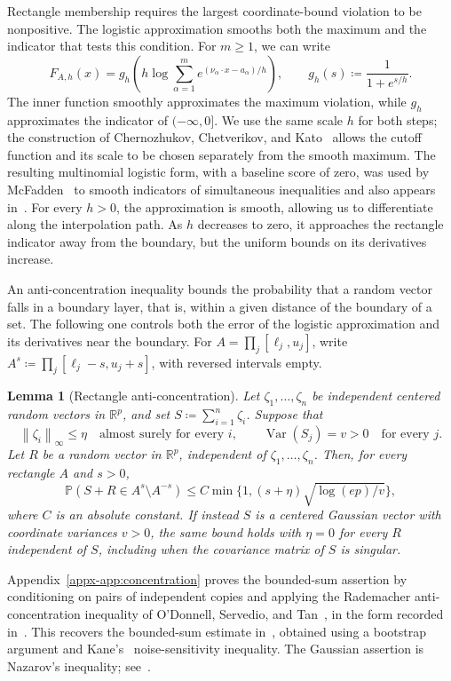 \documentclass[11pt,letterpaper]{article}
\newtheorem{lemma}{Lemma}
\theoremstyle{remark}
\newcommand{\Pp}{\mathbb P}
\newcommand{\R}{\mathbb R}
\newcommand{\Var}{\operatorname{Var}}
\newcommand{\norm}[1]{\left\lVert#1\right\rVert}
\begin{document}
Rectangle membership requires the largest coordinate-bound violation
to be nonpositive. The logistic approximation smooths both the maximum and the
indicator that tests this condition. For \(m\ge1\), we can write
\[
 F_{A,h}(x)=g_h\!\left(h\log\sum_{\alpha=1}^m
 e^{(\nu_\alpha\cdot x-a_\alpha)/h}\right),
 \qquad g_h(s)\coloneqq \frac{1}{1+e^{s/h}}.
\]
The inner function smoothly approximates the maximum violation, while
\(g_h\) approximates the indicator of \(({-\infty},0]\). We use the
same scale \(h\) for both steps; the construction of Chernozhukov,
Chetverikov, and Kato~\cite{CCK2013} allows the cutoff function and
its scale to be chosen separately from the smooth maximum. The
resulting multinomial logistic form, with a baseline score of zero,
was used by McFadden~\cite[p.~1001]{McFadden1989} to smooth indicators
of simultaneous inequalities and also appears in~\cite[eq.~(5)]{GaoZhang}. For every \(h>0\), the approximation
is smooth, allowing us to differentiate along the interpolation path.
As \(h\) decreases to zero, it approaches the rectangle indicator
away from the boundary, but the uniform bounds on its derivatives
increase.

An anti-concentration inequality bounds the probability that a random
vector falls in a boundary layer, that is, within a given distance of
the boundary of a set. The following one controls both the error of
the logistic approximation and its derivatives near the boundary.
For \(A=\prod_j[\ell_j,u_j]\), write
\(A^s\coloneqq \prod_j[\ell_j-s,u_j+s]\), with reversed intervals empty.
\begin{lemma}[Rectangle anti-concentration]\label{lem:concentration}
Let \(\zeta_1,\ldots,\zeta_n\) be independent centered random vectors
in \(\R^p\), and set \(S\coloneqq \sum_{i=1}^n\zeta_i\). Suppose that
\[
 \norm{\zeta_i}_\infty\le\eta
 \quad\text{almost surely for every }i,
 \qquad
 \Var(S_j)=v>0\quad\text{for every }j.
\]
Let \(R\) be a random vector in \(\R^p\), independent of
\(\zeta_1,\ldots,\zeta_n\). Then, for every rectangle \(A\) and
\(s>0\),
\[
 \Pp(S+R\in A^s\setminus A^{-s})
 \le C\min\{1,(s+\eta)\sqrt{\log(ep)/v}\},
\]
where \(C\) is an absolute constant. If instead \(S\) is a centered
Gaussian vector with coordinate variances \(v>0\), the same bound
holds with \(\eta=0\) for every \(R\) independent of \(S\), including
when the covariance matrix of \(S\) is singular.
\end{lemma}
Appendix~\ref{appx-app:concentration} proves the bounded-sum
assertion by conditioning on pairs of independent copies and applying
the Rademacher anti-concentration inequality of O'Donnell, Servedio,
and Tan~\cite{OST}, in the form recorded
in~\cite[Lemma~J.4]{CCKK2022}. This recovers the bounded-sum estimate
in~\cite[Lemma~2.1]{AL}, obtained using
a bootstrap argument and Kane's~\cite{Kane} noise-sensitivity inequality.
The Gaussian assertion is Nazarov's inequality;
see~\cite[Lemma~A.1]{CCK2017}.
\end{document}
